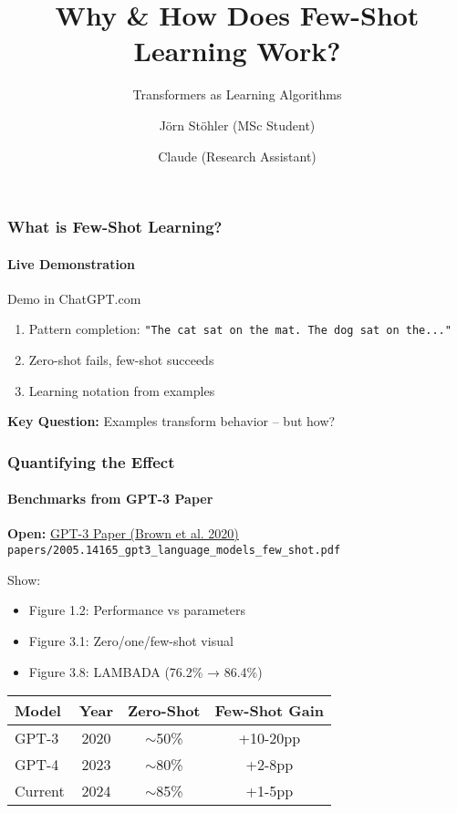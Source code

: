 \documentclass[10pt,aspectratio=169]{beamer}
\title{Why \& How Does Few-Shot Learning Work?}
\subtitle{Transformers as Learning Algorithms}
\author{Jörn Stöhler (MSc Student) \and Claude (Research Assistant)}
\institute{University of Augsburg}
\date{}
\begin{document}
\begin{frame}
\titlepage
\end{frame}



\begin{frame}
\frametitle{What is Few-Shot Learning?}
\framesubtitle{Live Demonstration}

\begin{center}
\Large
Demo in ChatGPT.com
\end{center}

\vspace{1cm}

\begin{enumerate}
    \item Pattern completion: \texttt{"The cat sat on the mat. The dog sat on the..."}
    \item Zero-shot fails, few-shot succeeds
    \item Learning notation from examples
\end{enumerate}

\vspace{1cm}
\textbf{Key Question:} Examples transform behavior -- but how?
\end{frame}


\begin{frame}
\frametitle{Quantifying the Effect}
\framesubtitle{Benchmarks from GPT-3 Paper}

\begin{center}
\Large
\textbf{Open:} \href{papers/2005.14165_gpt3_language_models_few_shot.pdf}{\color{blue}GPT-3 Paper (Brown et al. 2020)}\\\small{\texttt{papers/2005.14165\_gpt3\_language\_models\_few\_shot.pdf}}
\end{center}

\vspace{0.5cm}
Show:
\begin{itemize}
    \item Figure 1.2: Performance vs parameters
    \item Figure 3.1: Zero/one/few-shot visual
    \item Figure 3.8: LAMBADA (76.2\% → 86.4\%)
\end{itemize}

\vspace{0.5cm}
\begin{center}
\begin{tabular}{|l|c|c|c|}
\hline
Model & Year & Zero-Shot & Few-Shot Gain \\
\hline
GPT-3 & 2020 & $\sim$50\% & +10-20pp \\
GPT-4 & 2023 & $\sim$80\% & +2-8pp \\
Current & 2024 & $\sim$85\% & +1-5pp \\
\hline
\end{tabular}
\end{center}
\end{frame}
\end{document}
